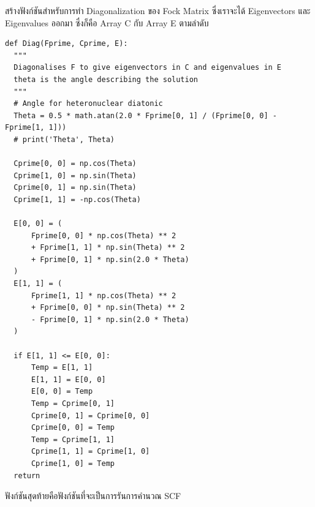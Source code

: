 \vspace{5pt}

\noindent {}

\vspace{5pt}

\noindent สร้างฟังก์ชันสำหรับการทำ Diagonalization ของ Fock Matrix ซึ่งเราจะได้ Eigenvectors และ Eigenvalues ออกมา
ซึ่งก็คือ Array C กับ Array E ตามลำดับ

\vspace{5pt}

\begin{lstlisting}[style=MyPython]
def Diag(Fprime, Cprime, E):
  """
  Diagonalises F to give eigenvectors in C and eigenvalues in E
  theta is the angle describing the solution
  """
  # Angle for heteronuclear diatonic
  Theta = 0.5 * math.atan(2.0 * Fprime[0, 1] / (Fprime[0, 0] - Fprime[1, 1]))
  # print('Theta', Theta)

  Cprime[0, 0] = np.cos(Theta)
  Cprime[1, 0] = np.sin(Theta)
  Cprime[0, 1] = np.sin(Theta)
  Cprime[1, 1] = -np.cos(Theta)

  E[0, 0] = (
      Fprime[0, 0] * np.cos(Theta) ** 2
      + Fprime[1, 1] * np.sin(Theta) ** 2
      + Fprime[0, 1] * np.sin(2.0 * Theta)
  )
  E[1, 1] = (
      Fprime[1, 1] * np.cos(Theta) ** 2
      + Fprime[0, 0] * np.sin(Theta) ** 2
      - Fprime[0, 1] * np.sin(2.0 * Theta)
  )

  if E[1, 1] <= E[0, 0]:
      Temp = E[1, 1]
      E[1, 1] = E[0, 0]
      E[0, 0] = Temp
      Temp = Cprime[0, 1]
      Cprime[0, 1] = Cprime[0, 0]
      Cprime[0, 0] = Temp
      Temp = Cprime[1, 1]
      Cprime[1, 1] = Cprime[1, 0]
      Cprime[1, 0] = Temp
  return
\end{lstlisting}

\vspace{5pt}

\noindent ฟังก์ชันสุดท้ายคือฟังก์ชันที่จะเป็นการรันการคำนวณ SCF

\vspace{5pt}

